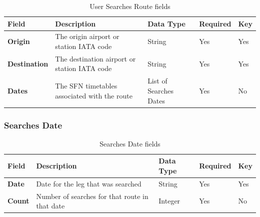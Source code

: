 \begin{table}[H]
\centering
\begin{tabular}{|>{\raggedright\arraybackslash}p{2.5cm}|>{\raggedright\arraybackslash}p{4cm}|>{\raggedright\arraybackslash}p{2.5cm}|>{\raggedright\arraybackslash}p{2cm}|>{\raggedright\arraybackslash}p{1.2cm}|}
\hline
\textbf{Field}       & \textbf{Description}                         & \textbf{Data Type}     & \textbf{Required} & \textbf{Key} \\ \hline
\textbf{Origin}      & The origin airport or station IATA code      & String                 & Yes               & Yes          \\ \hline
\textbf{Destination} & The destination airport or station IATA code & String                 & Yes               & Yes          \\ \hline
\textbf{Dates}       & The SFN timetables associated with the route & List of Searches Dates & Yes               & No           \\ \hline
\end{tabular}
\caption{User Searches Route fields}
\end{table}

\subsubsection*{Searches Date}

\begin{table}[H]
\centering
\begin{tabular}{|>{\raggedright\arraybackslash}p{2.5cm}|>{\raggedright\arraybackslash}p{4cm}|>{\raggedright\arraybackslash}p{2.5cm}|>{\raggedright\arraybackslash}p{2cm}|>{\raggedright\arraybackslash}p{1.2cm}|}
\hline
\textbf{Field} & \textbf{Description}                           & \textbf{Data Type} & \textbf{Required} & \textbf{Key} \\ \hline
\textbf{Date}  & Date for the leg that was searched             & String             & Yes               & Yes          \\ \hline
\textbf{Count} & Number of searches for that route in that date & Integer            & Yes               & No           \\ \hline
\end{tabular}
\caption{Searches Date fields}
\end{table}







